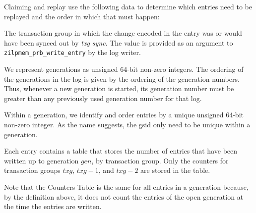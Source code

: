 \documentclass[12pt,a4paper,twoside]{book}
\begin{document}
Claiming and replay use the following data to determine which entries need to be replayed and the order in which that must happen:
\begin{description}[noitemsep,leftmargin=1.5cm,labelindent=1cm]
    \item[Transaction Group (txg)] The transaction group in which the change encoded in the entry was or would have been synced out by \textit{txg sync}.
        The value is provided as an argument to \lstinline{zilpmem_prb_write_entry} by the log writer.
    \item[Generation Number (gen)] We represent generations as unsigned 64-bit non-zero integers.
        The ordering of the generations in the log is given by the ordering of the generation numbers.
        Thus, whenever a new generation is started, its generation number must be greater than any previously used generation number for that log.
    \item[Generation-Scoped ID (gsid)] Within a generation, we identify and order entries by a unique unsigned 64-bit non-zero integer.
        As the name suggests, the gsid only need to be unique within a generation.
    \item[Counters Table] Each entry contains a table that stores the number of entries that have been written up to generation $gen$, by transaction group.
        Only the counters for transaction groups $txg$, $txg - 1$, and $txg - 2$ are stored in the table.
\end{description}
Note that the Counters Table is the same for all entries in a generation because, by the definition above, it does not count the entries of the open generation at the time the entries are written.
\end{document}
